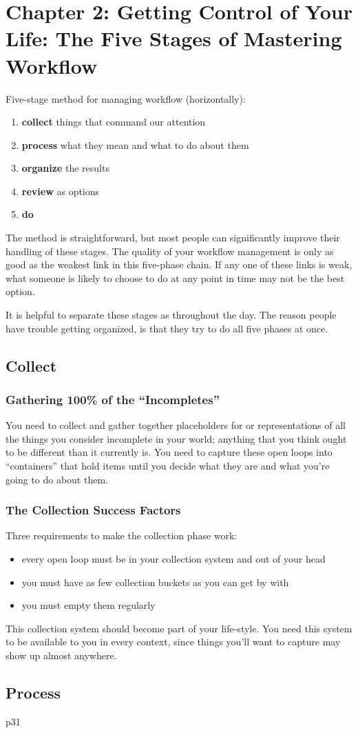 \documentclass[letterpaper]{article}
\newcommand{\p}{\vspace{1em}\par}		%
\begin{document}
\section{Chapter 2: Getting Control of Your Life: The Five Stages of Mastering Workflow}
Five-stage method for managing workflow (horizontally):
\begin{enumerate}
\item \textbf{collect} things that command our attention
\item \textbf{process} what they mean and what to do about them
\item \textbf{organize} the results
\item \textbf{review} as options
\item \textbf{do}
\end{enumerate}
The method is straightforward, but most people can significantly improve their handling of these stages. The quality of your workflow management is only as good as the weakest link in this five-phase chain. If any one of these links is weak, what someone is likely to choose to do at any point in time may not be the best option. 

\p It is helpful to separate these stages as throughout the day. The reason people have trouble getting organized, is that they try to do all five phases at once.

\subsection{Collect}
\subsubsection*{Gathering 100\% of the ``Incompletes''}
You need to collect and gather together placeholders for or representations of all the things you consider incomplete in your world; anything that you think ought to be different than it currently is. You need to capture these open loops into ``containers'' that hold items until you decide what they are and what you're going to do about them.

\subsubsection*{The Collection Success Factors}
Three requirements to make the collection phase work:
\begin{itemize}
\item every open loop must be in your collection system and out of your head
\item you must have as few collection buckets as you can get by with
\item you must empty them regularly
\end{itemize}
This collection system should become part of your life-style. You need this system to be available to you in every context, since things you'll want to capture may show up almost anywhere.

\subsection{Process}
p31
\end{document}
